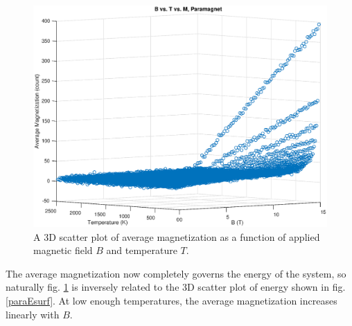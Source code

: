 \documentclass[12pt]{article}
\begin{document}
\begin{figure}[!h]
\includegraphics[width=\linewidth]{./Paragraphs/paraMsurf.eps}
\caption{A 3D scatter plot of average magnetization as a function of applied magnetic field $B$ and temperature $T$.}
\label{paraMsurf}
\end{figure}
The average magnetization now completely governs the energy of the system, so naturally fig. \ref{paraMsurf} is inversely related to the 3D scatter plot of energy shown in fig. \ref{paraEsurf}.  At low enough temperatures, the average magnetization increases linearly with $B$.
\end{document}
